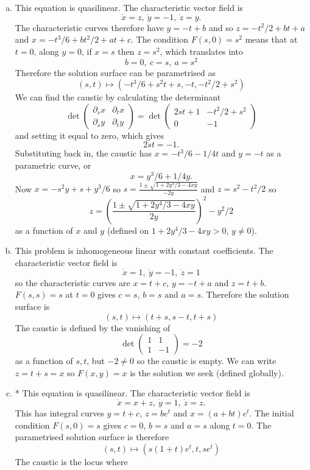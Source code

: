 \documentclass[12pt]{article}
\begin{document}
\iffalse
\begin{answer}
\begin{enumerate}[(a)]
\item This equation is quasilinear. The characteristic vector field is
\[\dot{x}=z,\ \dot{y}=-1,\ \dot{z}=y.\]
The characteristic curves therefore have $y=-t+b$ and so $z=-t^2/2+bt+a$ and $x=-t^3/6+bt^2/2+at+c$. The condition $F(s,0)=s^2$ means that at $t=0$, along $y=0$, if $x=s$ then $z=s^2$, which translates into
\[b=0,\ c=s,\ a=s^2\]
Therefore the solution surface can be parametrised as
\[(s,t)\mapsto (-t^3/6+s^2t+s,-t,-t^2/2+s^2)\]
We can find the caustic by calculating the determinant
\[\det\left(\begin{array}{cc}\partial_sx & \partial_tx\\\partial_sy & \partial_ty\end{array}\right)=\det\left(\begin{array}{cc}2st+1 & -t^2/2+s^2\\ 0 & -1\end{array}\right)\]
and setting it equal to zero, which gives
\[2st=-1.\]
Substituting back in, the caustic has $x=-t^3/6-1/4t$ and $y=-t$ as a parametric curve, or
\[x=y^3/6+1/4y.\]
Now $x=-s^2y+s+y^3/6$ so $s=\frac{1\pm\sqrt{1+2y^4/3-4xy}}{-2y}$ and $z=s^2-t^2/2$ so
\[z=\left(\frac{1\pm\sqrt{1+2y^4/3-4xy}}{2y}\right)^2-y^2/2\]
as a function of $x$ and $y$ (defined on $1+2y^4/3-4xy>0$, $y\neq 0$).
\item This problem is inhomogeneous linear with constant coefficients. The characteristic vector field is
\[\dot{x}=1,\ \dot{y}=-1,\ \dot{z}=1\]
so the characteristic curves are $x=t+c$, $y=-t+a$ and $z=t+b$. $F(s,s)=s$ at $t=0$ gives $c=s$, $b=s$ and $a=s$. Therefore the solution surface is
\[(s,t)\mapsto(t+s,s-t,t+s)\]
The caustic is defined by the vanishing of
\[\det\left(\begin{array}{cc}1 & 1\\ 1&-1\end{array}\right)=-2\]
as a function of $s,t$, but $-2\neq 0$ so the caustic is empty. We can write $z=t+s=x$ so $F(x,y)=x$ is the solution we seek (defined globally).
\item * This equation is quasilinear. The characteristic vector field is
\[\dot{x}=x+z,\ \dot{y}=1,\ \dot{z}=z.\]
This has integral curves $y=t+c$, $z=be^t$ and $x=(a+bt)e^t$. The initial condition $F(s,0)=s$ gives $c=0$, $b=s$ and $a=s$ along $t=0$. The parametrised solution surface is therefore
\[(s,t)\mapsto (s(1+t)e^t,t,se^t)\]
The caustic is the locus where

\end{enumerate}
\end{answer}
\end{document}
